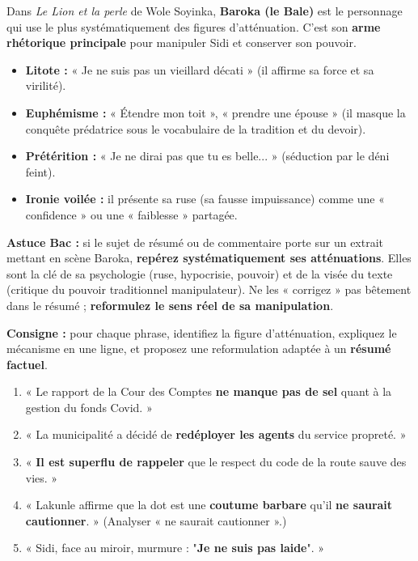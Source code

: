 \documentclass[11pt]{article}
\begin{document}
\begin{savaistu}
Dans \emph{Le Lion et la perle} de Wole Soyinka, \textbf{Baroka (le Bale)} est le personnage qui use le plus systématiquement des figures d'atténuation. C'est son \textbf{arme rhétorique principale} pour manipuler Sidi et conserver son pouvoir.
\begin{itemize}
    \item \textbf{Litote :} « Je ne suis pas un vieillard décati » (il affirme sa force et sa virilité).
    \item \textbf{Euphémisme :} « Étendre mon toit », « prendre une épouse » (il masque la conquête prédatrice sous le vocabulaire de la tradition et du devoir).
    \item \textbf{Prétérition :} « Je ne dirai pas que tu es belle... » (séduction par le déni feint).
    \item \textbf{Ironie voilée :} il présente sa ruse (sa fausse impuissance) comme une « confidence » ou une « faiblesse » partagée.
\end{itemize}
\textbf{Astuce Bac :} si le sujet de résumé ou de commentaire porte sur un extrait mettant en scène Baroka, \textbf{repérez systématiquement ses atténuations}. Elles sont la clé de sa psychologie (ruse, hypocrisie, pouvoir) et de la visée du texte (critique du pouvoir traditionnel manipulateur). Ne les « corrigez » pas bêtement dans le résumé ; \textbf{reformulez le sens réel de sa manipulation}.
\end{savaistu}

\begin{exercice}
\textbf{Consigne :} pour chaque phrase, identifiez la figure d'atténuation, expliquez le mécanisme en une ligne, et proposez une reformulation adaptée à un \textbf{résumé factuel}.
\begin{enumerate}
    \item « Le rapport de la Cour des Comptes \textbf{ne manque pas de sel} quant à la gestion du fonds Covid. »
    \item « La municipalité a décidé de \textbf{redéployer les agents} du service propreté. »
    \item « \textbf{Il est superflu de rappeler} que le respect du code de la route sauve des vies. »
    \item « Lakunle affirme que la dot est une \textbf{coutume barbare} qu'il \textbf{ne saurait cautionner}. » (Analyser « ne saurait cautionner ».)
    \item « Sidi, face au miroir, murmure : "\textbf{Je ne suis pas laide}". »
\end{enumerate}
\end{exercice}
\end{document}
